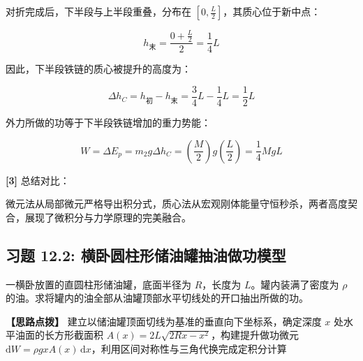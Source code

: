 \documentclass[11pt,a4paper,UTF8]{ctexart}
\begin{document}
\begin{solbox}[分步推导与答题规范]
对折完成后，下半段与上半段重叠，分布在 $[0, \frac{L}{2}]$，其质心位于新中点：


\begin{equation*}
h_{\text{末}} = \frac{0 + \frac{L}{2}}{2} = \frac{1}{4}L
\end{equation*}


因此，下半段铁链的质心被提升的高度为：


\begin{equation*}
\Delta h_C = h_{\text{初}} - h_{\text{末}} = \frac{3}{4}L - \frac{1}{4}L = \frac{1}{2}L
\end{equation*}


外力所做的功等于下半段铁链增加的重力势能：


\begin{equation*}
W = \Delta E_p = m_2 g \Delta h_C = \left(\frac{M}{2}\right) g \left(\frac{L}{2}\right) = \frac{1}{4}M g L
\end{equation*}


\textbf{[3]} 总结对比：

微元法从局部微元严格导出积分式，质心法从宏观刚体能量守恒秒杀，两者高度契合，展现了微积分与力学原理的完美融合。
\end{solbox}


\subsection{习题 12.2: 横卧圆柱形储油罐抽油做功模型}

一横卧放置的直圆柱形储油罐，底面半径为 $R$，长度为 $L$。罐内装满了密度为 $\rho$ 的油。求将罐内的油全部从油罐顶部水平切线处的开口抽出所做的功。

\textbf{\color{DeepPurple}【思路点拨】} 建立以储油罐顶面切线为基准的垂直向下坐标系，确定深度 $x$ 处水平油面的长方形截面积 $A(x) = 2L\sqrt{2Rx - x^2}$，构建提升做功微元 $\mathrm{d}W = \rho g x A(x)\,\mathrm{d}x$，利用区间对称性与三角代换完成定积分计算
\end{document}

